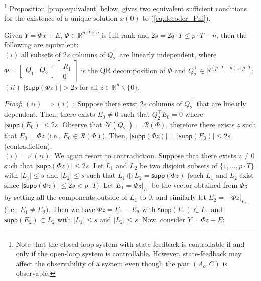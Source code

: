 \documentclass[../../thesis.tex]{subfiles}
\begin{document}
\footnote{Note that the closed-loop system with state-feedback is controllable if and only if the open-loop system is controllable. However, state-feedback may affect the observability of a system even though the pair $(A_o,C)$ is observable.}
Proposition \ref{prop:equivalent} below, gives two equivalent sufficient conditions for the existence of a unique solution $x(0)$ to (\ref{eq:decoder_Phi}).

\begin{proposition} \label{prop:equivalent}
	Given $Y=\Phi x + E$, $\Phi \in \mathbb{R}^{p\cdot T \times n}$ is full rank and $2s = 2q\cdot T \leq  p\cdot T-n$, then the following are equivalent: \\
$(i)$ all subsets of $2s$ columns of $Q_2 ^\top$ are linearly independent, where  $\Phi = \begin{bmatrix} Q_1 & Q_2 \end{bmatrix} \begin{bmatrix} R_1 \\ 0 \end{bmatrix}$ is the QR decomposition of $\Phi$ and $Q_2 ^\top \in \mathbb{R}^{(p\cdot T-n)\times p\cdot T}$;\\
$(ii)$ $\lvert \textsf{supp}( \Phi z) \rvert > 2 s$ for all $z \in \mathbb{R}^n \backslash \{ 0 \}$.
\end{proposition}

\textit{Proof}:
$(ii) \implies (i)~:$ Suppose there exist $2s$ columns of $Q_2^\top$ that are linearly dependent. Then, there exists $E_0 \neq 0$ such that $Q_2^\top E_0 = 0$ where $\lvert \textsf{supp}(E_0) \rvert \le 2s$. Observe that $\mathcal{N}(Q_2^\top) = \mathcal{R}(\Phi)$, therefore there exists $z$ such that $E_0 = \Phi z$ (i.e., $E_0 \in \mathcal{R}(\Phi)$). Then, $ \lvert  \textsf{supp}(\Phi z) \rvert = \lvert \textsf {supp} (E_0) \rvert \le 2s $ (contradiction).\\
$(i) \implies (ii)$: We again resort to contradiction. Suppose that there exists $z\neq 0$ such that $\lvert \textsf{supp}(\Phi z)\rvert \le 2s$. Let $L_1$ and $L_2$ be two disjoint subsets of $\{1,..., p\cdot T \}$ with $\lvert L_1 \rvert \le s$ and $\lvert L_2 \rvert \le s$ such that $L_1 \oplus L_2 = \textsf{supp}(\Phi z)$ (such $L_1$ and $L_2$ exist since $\lvert \textsf{supp}(\Phi z) \rvert \le 2s < p\cdot T$). Let $E_1 = \Phi z \lvert _{L_1}$ be the vector obtained from $\Phi z$ by setting all the components outside of $L_1$ to 0, and similarly let $E_2= - \Phi z \lvert _{L_2}$ (i.e., $E_1 \neq E_2$). Then we have $\Phi z = E_1 - E_2$ with $\textsf{supp}(E_1) \subset L_1$ and $\textsf{supp}(E_2) \subset L_2$ with $\lvert L_1 \rvert \le s$ and $\lvert L_2 \rvert \le s$. Now, consider $Y=\Phi z + E$:
\end{document}
